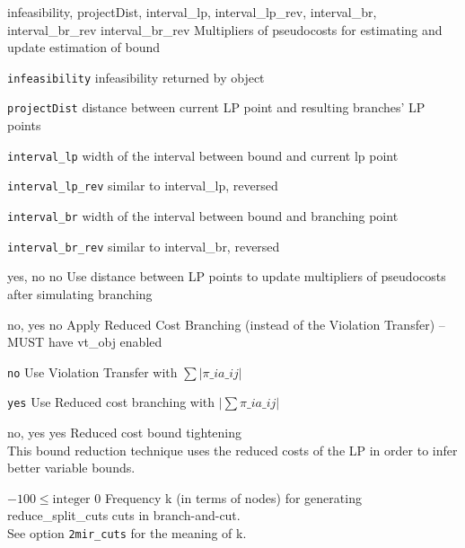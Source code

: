 %
{infeasibility, projectDist, interval\_lp, interval\_lp\_rev, interval\_br, interval\_br\_rev}%
{interval\_br\_rev}%
{Multipliers of pseudocosts for estimating and update estimation of bound}%
{\begin{list}{}{
\setlength{\parsep}{0em}
\setlength{\leftmargin}{5ex}
\setlength{\labelwidth}{2ex}
\setlength{\itemindent}{0ex}
\setlength{\topsep}{0pt}}
\item[\texttt{infeasibility}] infeasibility returned by object
\item[\texttt{projectDist}] distance between current LP point and resulting branches' LP points
\item[\texttt{interval\_lp}] width of the interval between bound and current lp point
\item[\texttt{interval\_lp\_rev}] similar to interval\_lp, reversed
\item[\texttt{interval\_br}] width of the interval between bound and branching point
\item[\texttt{interval\_br\_rev}] similar to interval\_br, reversed
\end{list}
}

%
{yes, no}%
{no}%
{Use distance between LP points to update multipliers of pseudocosts after simulating branching}%
{}

%
{no, yes}%
{no}%
{Apply Reduced Cost Branching (instead of the Violation Transfer) -- MUST have vt\_obj enabled}%
{\begin{list}{}{
\setlength{\parsep}{0em}
\setlength{\leftmargin}{5ex}
\setlength{\labelwidth}{2ex}
\setlength{\itemindent}{0ex}
\setlength{\topsep}{0pt}}
\item[\texttt{no}] Use Violation Transfer with $\sum |\pi\_i a\_{ij}|$
\item[\texttt{yes}] Use Reduced cost branching with $|\sum \pi\_i a\_{ij}|$
\end{list}
}

%
{no, yes}%
{yes}%
{Reduced cost bound tightening\\
This bound reduction technique uses the reduced costs of the LP in order to infer better variable bounds.}%
{}

%
{$-100\leq\textrm{integer}$}%
{$0$}%
{Frequency k (in terms of nodes) for generating reduce\_split\_cuts cuts in branch-and-cut.\\
See option \texttt{2mir\_cuts} for the meaning of k.}%
{}

